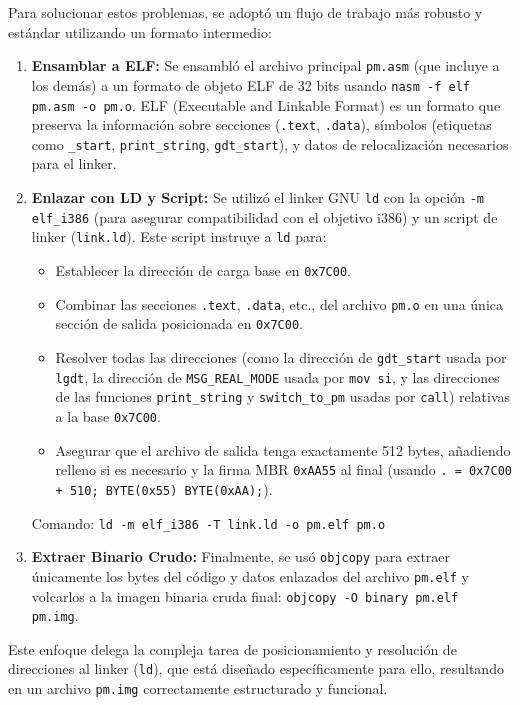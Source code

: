 Para solucionar estos problemas, se adoptó un flujo de trabajo más robusto y estándar utilizando un formato intermedio:
\begin{enumerate}
    \item \textbf{Ensamblar a ELF:} Se ensambló el archivo principal \texttt{pm.asm} (que incluye a los demás) a un formato de objeto ELF de 32 bits usando \texttt{nasm -f elf pm.asm -o pm.o}. ELF (Executable and Linkable Format) es un formato que preserva la información sobre secciones (\texttt{.text}, \texttt{.data}), símbolos (etiquetas como \texttt{\_start}, \texttt{print\_string}, \texttt{gdt\_start}), y datos de relocalización necesarios para el linker.
    \item \textbf{Enlazar con LD y Script:} Se utilizó el linker GNU \texttt{ld} con la opción \texttt{-m elf\_i386} (para asegurar compatibilidad con el objetivo i386) y un script de linker (\texttt{link.ld}). Este script instruye a \texttt{ld} para:
        \begin{itemize}
            \item Establecer la dirección de carga base en \texttt{0x7C00}.
            \item Combinar las secciones \texttt{.text}, \texttt{.data}, etc., del archivo \texttt{pm.o} en una única sección de salida posicionada en \texttt{0x7C00}.
            \item Resolver todas las direcciones (como la dirección de \texttt{gdt\_start} usada por \texttt{lgdt}, la dirección de \texttt{MSG\_REAL\_MODE} usada por \texttt{mov si}, y las direcciones de las funciones \texttt{print\_string} y \texttt{switch\_to\_pm} usadas por \texttt{call}) relativas a la base \texttt{0x7C00}.
            \item Asegurar que el archivo de salida tenga exactamente 512 bytes, añadiendo relleno si es necesario y la firma MBR \texttt{0xAA55} al final (usando \texttt{. = 0x7C00 + 510; BYTE(0x55) BYTE(0xAA);}).
        \end{itemize}
        Comando: \texttt{ld -m elf\_i386 -T link.ld -o pm.elf pm.o}
    \item \textbf{Extraer Binario Crudo:} Finalmente, se usó \texttt{objcopy} para extraer únicamente los bytes del código y datos enlazados del archivo \texttt{pm.elf} y volcarlos a la imagen binaria cruda final: \texttt{objcopy -O binary pm.elf pm.img}.
\end{enumerate}
Este enfoque delega la compleja tarea de posicionamiento y resolución de direcciones al linker (\texttt{ld}), que está diseñado específicamente para ello, resultando en un archivo \texttt{pm.img} correctamente estructurado y funcional.

